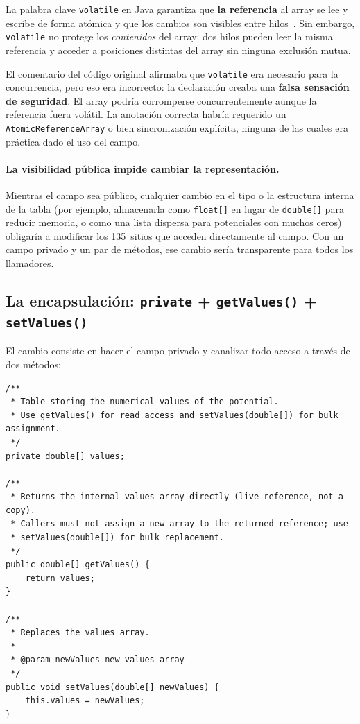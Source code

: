 \documentclass[11pt,a4paper]{article}
\newcommand{\code}[1]{\texttt{#1}}
\begin{document}
La palabra clave \code{volatile} en Java garantiza que \textbf{la
referencia} al array se lee y escribe de forma atómica y que los
cambios son visibles entre hilos~\cite{goetz2006}.  Sin embargo,
\code{volatile} no protege los \emph{contenidos} del array: dos hilos
pueden leer la misma referencia y acceder a posiciones distintas del
array sin ninguna exclusión mutua.

El comentario del código original afirmaba que \code{volatile} era
necesario para la concurrencia, pero eso era incorrecto: la
declaración creaba una \textbf{falsa sensación de seguridad}.  El
array podría corromperse concurrentemente aunque la referencia fuera
volátil.  La anotación correcta habría requerido un
\code{AtomicReferenceArray} o bien sincronización explícita, ninguna
de las cuales era práctica dado el uso del campo.

\paragraph{La visibilidad pública impide cambiar la representación.}

Mientras el campo sea público, cualquier cambio en el tipo o la
estructura interna de la tabla (por ejemplo, almacenarla como
\code{float[]} en lugar de \code{double[]} para reducir memoria, o
como una lista dispersa para potenciales con muchos ceros) obligaría
a modificar los 135~sitios que acceden directamente al campo.  Con un
campo privado y un par de métodos, ese cambio sería transparente para
todos los llamadores.

\subsection{La encapsulación: \code{private} + \code{getValues()} + \code{setValues()}}

El cambio consiste en hacer el campo privado y canalizar todo acceso
a través de dos métodos:

\begin{lstlisting}[caption={Campo \texttt{values} después de la encapsulación.},
                   label=lst:values-despues]
/**
 * Table storing the numerical values of the potential.
 * Use getValues() for read access and setValues(double[]) for bulk assignment.
 */
private double[] values;

/**
 * Returns the internal values array directly (live reference, not a copy).
 * Callers must not assign a new array to the returned reference; use
 * setValues(double[]) for bulk replacement.
 */
public double[] getValues() {
    return values;
}

/**
 * Replaces the values array.
 *
 * @param newValues new values array
 */
public void setValues(double[] newValues) {
    this.values = newValues;
}
\end{lstlisting}
\end{document}
